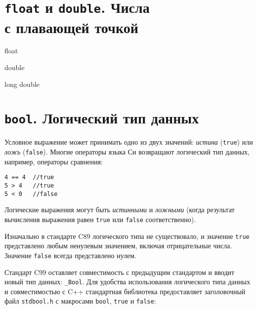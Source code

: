 \documentclass[myc.tex]{subfiles}
\begin{document}
\section[\texttt{float} и \texttt{double}. Числа с плавающей точкой]{\texttt{float} и \texttt{double}. Числа\\ с плавающей точкой}


float

double

long double

































\section{\texttt{bool}. Логический тип данных}

Условное выражение может принимать одно из двух значений: \textit{истина} (\texttt{true}) или \textit{ложь} (\texttt{false}). Многие операторы языка Си возвращают логический тип данных, например, операторы сравнения:

\begin{lstlisting}
4 == 4  //true
5 > 4   //true
5 < 0   //false
\end{lstlisting}

Логические выражения могут быть \textit{истинными} и \textit{ложными} (когда результат вычисления выражения равен \texttt{true} или \texttt{false} соответственно).

Изначально в стандарте C89 логического типа не существовало, и значение \texttt{true} представлено любым ненулевым значением, включая отрицательные числа. Значение \texttt{false} всегда представлено нулем. 

Стандарт C99 оставляет совместимость с предыдущим стандартом и вводит новый тип данных: \texttt{\_Bool}. Для удобства использования логического типа данных и совместимостью с C++ стандартная библиотека предоставляет заголовочный файл \texttt{stdbool.h} с макросами \texttt{bool}, \texttt{true} и \texttt{false}:
\end{document}
